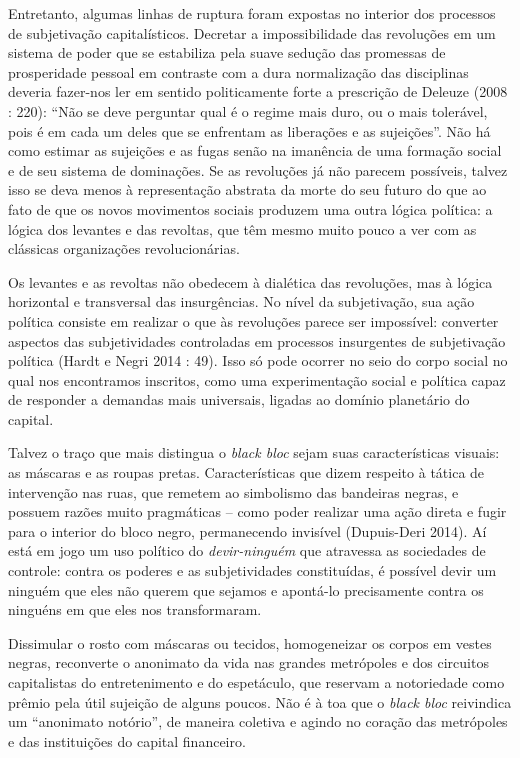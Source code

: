 Entretanto, algumas linhas de ruptura foram expostas no interior dos
processos de subjetivação capitalísticos. Decretar a impossibilidade das
revoluções em um sistema de poder que se estabiliza pela suave sedução
das promessas de prosperidade pessoal em contraste com a dura
normalização das disciplinas deveria fazer-nos ler em sentido
politicamente forte a prescrição de Deleuze (2008 : 220): ``Não se deve
perguntar qual é o regime mais duro, ou o mais tolerável, pois é em cada
um deles que se enfrentam as liberações e as sujeições''. Não há como
estimar as sujeições e as fugas senão na imanência de uma formação
social e de seu sistema de dominações. Se as revoluções já não parecem
possíveis, talvez isso se deva menos à representação abstrata da morte
do seu futuro do que ao fato de que os novos movimentos sociais produzem
uma outra lógica política: a lógica dos levantes e das revoltas, que têm
mesmo muito pouco a ver com as clássicas organizações revolucionárias.

Os levantes e as revoltas não obedecem à dialética das revoluções, mas à
lógica horizontal e transversal das insurgências. No nível da
subjetivação, sua ação política consiste em realizar o que às revoluções
parece ser impossível: converter aspectos das subjetividades controladas
em processos insurgentes de subjetivação política (Hardt e Negri 2014 :
49). Isso só pode ocorrer no seio do corpo social no qual nos
encontramos inscritos, como uma experimentação social e política capaz
de responder a demandas mais universais, ligadas ao domínio planetário
do capital.

Talvez o traço que mais distingua o \emph{black bloc} sejam suas
características visuais: as máscaras e as roupas pretas. Características
que dizem respeito à tática de intervenção nas ruas, que remetem ao
simbolismo das bandeiras negras, e possuem razões muito pragmáticas --
como poder realizar uma ação direta e fugir para o interior do bloco
negro, permanecendo invisível (Dupuis-Deri 2014). Aí está em jogo um uso
político do \emph{devir-ninguém }que atravessa as sociedades de
controle: contra os poderes e as subjetividades constituídas, é possível
devir um ninguém que eles não querem que sejamos e apontá-lo
precisamente contra os ninguéns em que eles nos transformaram.

Dissimular o rosto com máscaras ou tecidos, homogeneizar os corpos em
vestes negras, reconverte o anonimato da vida nas grandes metrópoles e
dos circuitos capitalistas do entretenimento e do espetáculo, que
reservam a notoriedade como prêmio pela útil sujeição de alguns poucos.
Não é à toa que o \emph{black bloc }reivindica um ``anonimato
notório'',\emph{ }de maneira coletiva e agindo no coração das metrópoles
e das instituições do capital financeiro.

